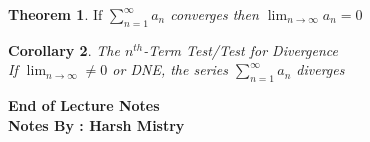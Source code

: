 \documentclass{article}
\newcounter{lecnum}
\newtheorem{theorem}{Theorem}[lecnum]
\newtheorem{corollary}[theorem]{Corollary}
\begin{document}
\newpage

\begin{theorem}
\( \text{If } \sum_{n=1}^{\infty} a_n\) converges then \(\lim_{n \to \infty} a_n = 0 \)
\end{theorem}

\begin{corollary} The \(n^{th}\)-Term Test/Test for Divergence \\
If \( \lim_{n \to \infty} \neq 0\) or DNE, the series \(\sum_{n=1}^{\infty} a_n \) diverges\end{corollary}

\begin{center}
\textbf{End of Lecture Notes} \\
\textbf{Notes By : Harsh Mistry}
\end{center}
\end{document}
